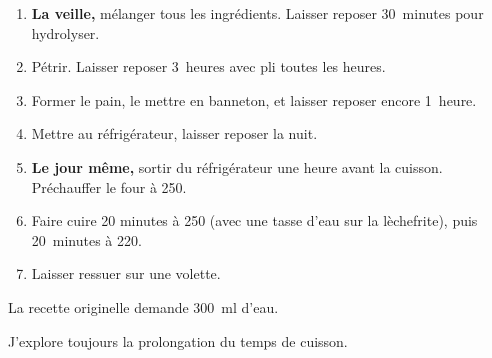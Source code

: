 
\begin{ingredients}
\end{ingredients}


\begin{recipe}
  \begin{enumerate}

  \item \textbf{La veille,} mélanger tous les ingrédients.  Laisser
    reposer 30~minutes pour hydrolyser.
    
  \item Pétrir.  Laisser reposer 3~heures avec pli toutes les heures.
    
  \item Former le pain, le mettre en banneton, et laisser reposer
    encore 1~heure.

  \item Mettre au réfrigérateur, laisser reposer la nuit.
    
  \item \textbf{Le jour même,} sortir du réfrigérateur une heure avant
    la cuisson.  Préchauffer le four à 250\degreeC.

  \item Faire cuire 20 minutes à 250\degreeC{} (avec une tasse d'eau sur
    la lèchefrite), puis 20~minutes à 220\degreeC.
    
  \item Laisser ressuer sur une volette.

  \end{enumerate}
\end{recipe}


La recette originelle demande 300~ml d'eau.

J'explore toujours la prolongation du temps de cuisson.

